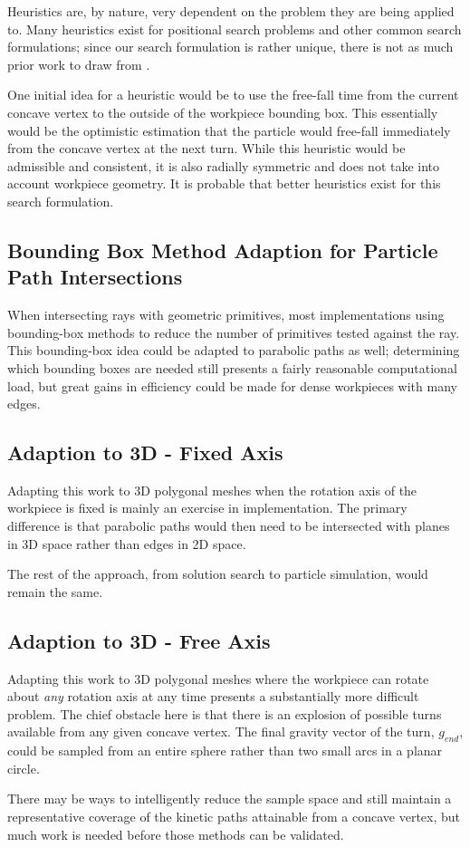 Heuristics are, by nature, very dependent on the problem they are being applied to. Many heuristics exist for positional search problems and other common search formulations; since our search formulation is rather unique, there is not as much prior work to draw from \cite{christofides1976worst}.

One initial idea for a heuristic would be to use the free-fall time from the current concave vertex to the outside of the workpiece bounding box. This essentially would be the optimistic estimation that the particle would free-fall immediately from the concave vertex at the next turn. While this heuristic would be admissible and consistent, it is also radially symmetric and does not take into account workpiece geometry. It is probable that better heuristics exist for this search formulation.

  \subsection{Bounding Box Method Adaption for Particle Path Intersections}

When intersecting rays with geometric primitives, most implementations using bounding-box methods to reduce the number of primitives tested against the ray. This bounding-box idea could be adapted to parabolic paths as well; determining which bounding boxes are needed still presents a fairly reasonable computational load, but great gains in efficiency could be made for dense workpieces with many edges.

  \subsection{Adaption to 3D - Fixed Axis}

Adapting this work to 3D polygonal meshes when the rotation axis of the workpiece is fixed is mainly an exercise in implementation. The primary difference is that parabolic paths would then need to be intersected with planes in 3D space rather than edges in 2D space.

The rest of the approach, from solution search to particle simulation, would remain the same.

  \subsection{Adaption to 3D - Free Axis}

Adapting this work to 3D polygonal meshes where the workpiece can rotate about \emph{any} rotation axis at any time presents a substantially more difficult problem. The chief obstacle here is that there is an explosion of possible turns available from any given concave vertex. The final gravity vector of the turn, $g_{end}$, could be sampled from an entire sphere rather than two small arcs in a planar circle.

There may be ways to intelligently reduce the sample space and still maintain a representative coverage of the kinetic paths attainable from a concave vertex, but much work is needed before those methods can be validated.

